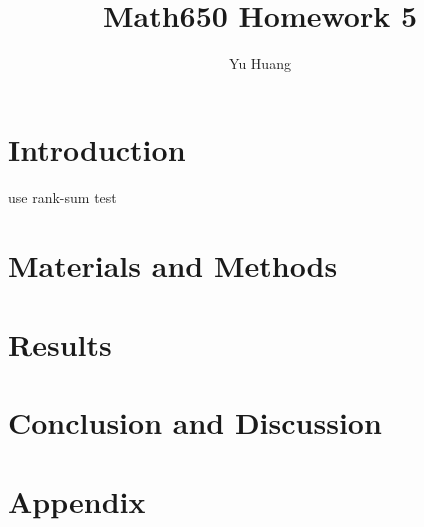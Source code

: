 \documentclass[a4paper,10pt]{article}
\title{Math650 Homework 5}
\author{Yu Huang}
\begin{document}
\maketitle

\begin{abstract}

\end{abstract}


\section{Introduction}
use rank-sum test

\section{Materials and Methods}


\section{Results}


\section{Conclusion and Discussion}


\section{Appendix}
\end{document}
